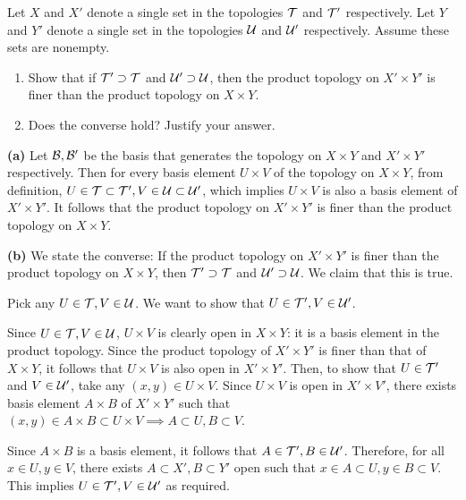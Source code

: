 \documentclass[a4paper, 12pt]{article}
\begin{document}
\begin{problem} 
Let $X$ and $X'$ denote a single set in the topologies $\mathcal{T}$ and $\mathcal{T}'$ respectively. Let $Y$ and $Y'$ denote a single set in the topologies $\mathcal{U}$ and $\mathcal{U}'$ respectively. Assume these sets are nonempty.
\begin{enumerate} 
\item Show that if $\mathcal{T}' \supset \mathcal{T}$ and $\mathcal{U}' \supset \mathcal{U}$, then the product topology on $X' \times Y'$ is finer than the product topology on $X \times Y$.
\item Does the converse hold? Justify your answer.
\end{enumerate}
\end{problem}
\begin{solution}
    \textbf{(a)} Let $\mathcal{B}, \mathcal{B}'$ be the basis that generates the topology on $X \times Y$ and $X' \times Y'$ respectively. Then for every basis element $U \times V$ of the topology on $X \times Y$, from definition, $U \in \mathcal{T} \subset \mathcal{T}', V \in \mathcal{U} \subset \mathcal{U}'$, which implies $U \times V$ is also a basis element of $X' \times Y'$. It follows that the product topology on $X' \times Y'$ is finer than the product topology on $X \times Y$.

    \textbf{(b)} We state the converse: If the product topology on $X' \times Y'$ is finer than the product topology on $X \times Y$, then $\mathcal{T}' \supset \mathcal{T}$ and $\mathcal{U}' \supset \mathcal{U}$. We claim that this is true.

    Pick any $U \in \mathcal{T}, V \in \mathcal{U}$. We want to show that $U \in \mathcal{T}', V \in \mathcal{U}'$.
    
    Since $U \in \mathcal{T}, V \in \mathcal{U}$, $U \times V$ is clearly open in $X \times Y$: it is a basis element in the product topology. Since the product topology of $X' \times Y'$ is finer than that of $X \times Y$, it follows that $U \times V$ is also open in $X' \times Y'$. Then, to show that $U \in \mathcal{T}'$ and $V \in \mathcal{U}'$, take any $(x, y) \in U \times V$. Since $U \times V$ is open in $X' \times V'$, there exists basis element $A \times B$ of $X' \times Y'$ such that $(x, y) \in A \times B \subset U \times V \implies A \subset U, B \subset V$. 
    
    Since $A \times B$ is a basis element, it follows that $A \in \mathcal{T}', B \in \mathcal{U}'$. Therefore, for all $x \in U, y \in V$, there exists $A \subset X', B \subset Y'$ open such that $x \in A \subset U, y \in B \subset V$. This implies $U \in \mathcal{T}', V \in \mathcal{U}'$ as required.
\end{solution}
\end{document}
